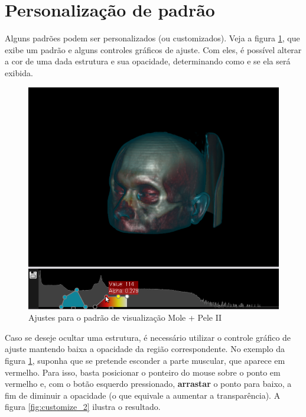 \newpage


\section{Personalização de padrão}

Alguns padrões podem ser personalizados (ou customizados). Veja a figura
\ref{fig:customize_1}, que exibe um padrão e alguns controles gráficos de ajuste.
Com eles, é possível alterar a cor de uma dada estrutura e sua opacidade, determinando
como e se ela será exibida.

\begin{figure}[!htb]
\centering
\includegraphics[scale=0.6]{../user_guide_figures/invesalius_screen/customize_1.png}
\caption{Ajustes para o padrão de visualização Mole + Pele II}
\label{fig:customize_1}
\end{figure}


\newpage


Caso se deseje ocultar uma estrutura, é necessário utilizar o controle gráfico de ajuste mantendo
baixa a opacidade da região correspondente. No exemplo da figura \ref{fig:customize_1},
suponha que se pretende esconder a parte muscular, que aparece em vermelho. Para isso, basta
posicionar o ponteiro do mouse sobre o ponto em vermelho e, com o botão esquerdo pressionado,
\textbf{arrastar} o ponto para baixo, a fim de diminuir a opacidade (o que equivale a aumentar
a transparência). A figura \ref{fig:customize_2} ilustra o resultado.

